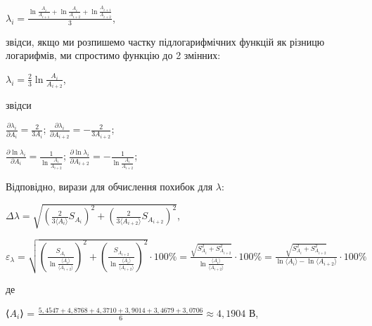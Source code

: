 \documentclass[12pt,a4paper]{article}
\begin{document}
    \begin{center}
        $\displaystyle \lambda_i = \frac{\ln \frac{A_i}{A_{i+1}} + \ln \frac{A_i}{A_{i+2}} + \ln \frac{A_{i+1}}{A_{i+2}}}{3}$,
    \end{center}

    звідси, якщо ми розпишемо частку підлогарифмічних функцій як різницю логарифмів, ми спростимо функцію до 2 змінних:

    \begin{center}
        $\displaystyle \lambda_i = \frac{2}{3} \ln \frac{A_i}{A_{i+2}}$,
    \end{center}

    звідси

    \begin{center}
        $\displaystyle \frac{\partial \lambda_i}{\partial A_i} = \frac{2}{3A_i}$; $\displaystyle \frac{\partial \lambda_i}{\partial A_{i+2}} = -\frac{2}{3A_{i+2}}$;
    \end{center}

    \begin{center}
        $\displaystyle \frac{\partial \ln \lambda_i}{\partial A_i} = \frac{1}{\ln \frac{A_i}{A_{i+2}}}$; $\displaystyle \frac{\partial \ln \lambda_i}{\partial A_{i+2}} = -\frac{1}{\ln \frac{A_i}{A_{i+2}}}$;
    \end{center}

    Відповідно, вирази для обчислення похибок для $\lambda$:

    \begin{center}
        $\displaystyle \Delta \lambda = \sqrt{\left( \frac{2}{3\text{⟨}A_i\text{⟩}} S_{A_i} \right)^2 + \left( \frac{2}{3\text{⟨}A_{i+2}\text{⟩}} S_{A_{i+2}}\right)^2}$,
    \end{center}

    \begin{center}
        $\displaystyle \varepsilon_{\lambda} = \sqrt{\left( \frac{S_{A_i}}{\ln \frac{\text{⟨}A_i\text{⟩}}{\text{⟨}A_{i+2}\text{⟩}}}\right)^2 + \left( \frac{S_{A_{i+2}}}{\ln \frac{\text{⟨}A_i\text{⟩}}{\text{⟨}A_{i+2}\text{⟩}}} \right)^2} \cdot 100 \% =
        \frac{\sqrt{S_{A_i}^2 + S_{A_{i+2}}^2}}{\ln \frac{\text{⟨}A_i\text{⟩}}{\text{⟨}A_{i+2}\text{⟩}}} \cdot 100 \% = \frac{\sqrt{S_{A_i}^2 + S_{A_{i+2}}^2}}{\ln \text{⟨}A_i\text{⟩} - \ln \text{⟨}A_{i+2}\text{⟩}} \cdot 100 \%$
    \end{center}

    де

    \begin{center}
        ⟨$\displaystyle A_i$⟩ = $\displaystyle \frac{5,4547 + 4,8768 + 4,3710 + 3,9014 + 3,4679 + 3,0706}{6} \approx 4,1904$ В,
    \end{center}
\end{document}
